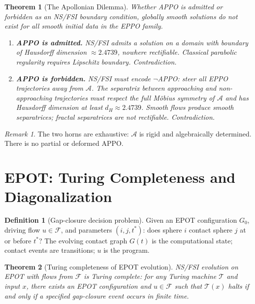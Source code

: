 \documentclass[11pt]{article}
\theoremstyle{plain}
\newtheorem{theorem}{Theorem}
\theoremstyle{definition}
\newtheorem{definition}{Definition}
\theoremstyle{remark}
\newtheorem{remark}{Remark}
\begin{document}
\begin{theorem}[The Apollonian Dilemma]
\label{thm:dilemma}
Whether APPO is admitted or forbidden as an NS/FSI boundary condition,
globally smooth solutions do not exist for all smooth initial data in the
EPPO family.
\begin{enumerate}
  \item[\textbf{(Horn~1)}] \textbf{APPO is admitted.} NS/FSI admits a
  solution on a domain with boundary of Hausdorff dimension $\approx 2.4739$,
  nowhere rectifiable. Classical parabolic regularity requires Lipschitz
  boundary. Contradiction.

  \item[\textbf{(Horn~2)}] \textbf{APPO is forbidden.} NS/FSI must encode
  $\neg$APPO: steer all EPPO trajectories away from $\mathcal{A}$. The
  separatrix between approaching and non-approaching trajectories must
  respect the full M\"{o}bius symmetry of $\mathcal{A}$ and has Hausdorff
  dimension at least $d_H \approx 2.4739$. Smooth flows produce smooth
  separatrices; fractal separatrices are not rectifiable. Contradiction.
\end{enumerate}
\end{theorem}

\begin{remark}
The two horns are exhaustive: $\mathcal{A}$ is rigid and algebraically
determined. There is no partial or deformed APPO.
\end{remark}

\section{EPOT: Turing Completeness and Diagonalization}
\label{sec:turing}

\begin{definition}[Gap-closure decision problem]
Given an EPOT configuration $G_0$, driving flow $u \in \mathcal{F}$, and
parameters $(i,j,t^*)$: does sphere $i$ contact sphere $j$ at or before
$t^*$? The evolving contact graph $G(t)$ is the computational state; contact
events are transitions; $u$ is the program.
\end{definition}

\begin{theorem}[Turing completeness of EPOT evolution]
\label{thm:turing}
NS/FSI evolution on EPOT with flows from $\mathcal{F}$ is Turing complete:
for any Turing machine $\mathcal{T}$ and input $x$, there exists an EPOT
configuration and $u \in \mathcal{F}$ such that $\mathcal{T}(x)$ halts
if and only if a specified gap-closure event occurs in finite time.
\end{theorem}
\end{document}
